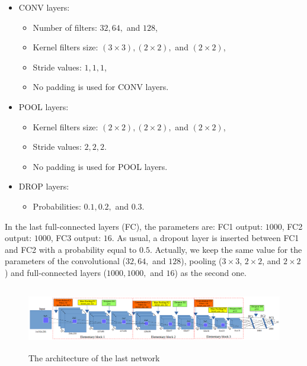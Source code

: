 \documentclass{article} %
\begin{document}
\begin{multicols}{2}
\begin{itemize}[nosep,label=\footnotesize$\bullet$]

\item CONV layers:
		\begin{itemize}[nosep]
			\item Number of filters: $32, 64,$ and $128$,
			\item Kernel filters size: $(3 \times 3), (2 \times 2),$ and $(2 \times 2)$,
			\item Stride values: $1, 1, 1$,
			\item No padding is used for CONV layers.
		\end{itemize}			
	\item POOL layers:
		\begin{itemize}[nosep]
			\item Kernel filters size: $(2 \times 2), (2 \times 2),$ and $(2 \times 2)$,
			\item Stride values: $2, 2, 2$.
			\item No padding is used for POOL layers.
		\end{itemize}
	\item DROP layers: 
		\begin{itemize}[nosep]
			\item Probabilities: $0.1, 0.2, $ and $0.3$.
		\end{itemize}
	\end{itemize}
In the last full-connected layers (FC), the parameters are: FC1 output:
$1000$, FC2 output: $1000$, FC3  output: $16$. As usual, a dropout layer is
inserted between FC1 and FC2 with a probability equal to $0.5$.
Actually, we keep the same value for the parameters of the convolutional ($32, 64,$ and $128$), pooling ($3 \times 3$, $2 \times 2$, and $2 \times 2$) and full-connected layers ($1000, 1000,$ and $16$) as the second one.

\begin{figure}[t]
	\centerline{\includegraphics[height=1.1in]{images/arch_model.png}}
	\caption{\footnotesize{The architecture of the last network}}
	\label{figarch}
\end{figure}


\end{multicols}
\end{document}
